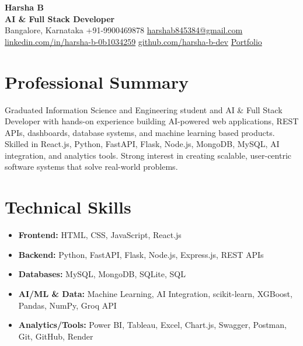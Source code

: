 \documentclass[a4paper,10pt]{article}
\begin{document}
\begin{center}
    {\Huge \textbf{Harsha B}} \\
    \vspace{3pt}
    \textbf{AI \& Full Stack Developer} \\
    Bangalore, Karnataka \textbar{} +91-9900469878 \textbar{}
    \href{mailto:harshab845384@gmail.com}{harshab845384@gmail.com} \\
    \href{https://www.linkedin.com/in/harsha-b-0b1034259/}{linkedin.com/in/harsha-b-0b1034259}
    \textbar{}
    \href{https://github.com/harsha-b-dev}{github.com/harsha-b-dev}
    \textbar{}
    \href{https://harsha-portfolio-lilac.vercel.app/}{Portfolio}
\end{center}

\section*{Professional Summary}
Graduated Information Science and Engineering student and AI \& Full Stack Developer with hands-on experience building AI-powered web applications, REST APIs, dashboards, database systems, and machine learning based products. Skilled in React.js, Python, FastAPI, Flask, Node.js, MongoDB, MySQL, AI integration, and analytics tools. Strong interest in creating scalable, user-centric software systems that solve real-world problems.

\section*{Technical Skills}
\begin{itemize}
    \item \textbf{Frontend:} HTML, CSS, JavaScript, React.js
    \item \textbf{Backend:} Python, FastAPI, Flask, Node.js, Express.js, REST APIs
    \item \textbf{Databases:} MySQL, MongoDB, SQLite, SQL
    \item \textbf{AI/ML \& Data:} Machine Learning, AI Integration, scikit-learn, XGBoost, Pandas, NumPy, Groq API
    \item \textbf{Analytics/Tools:} Power BI, Tableau, Excel, Chart.js, Swagger, Postman, Git, GitHub, Render
\end{itemize}
\end{document}
